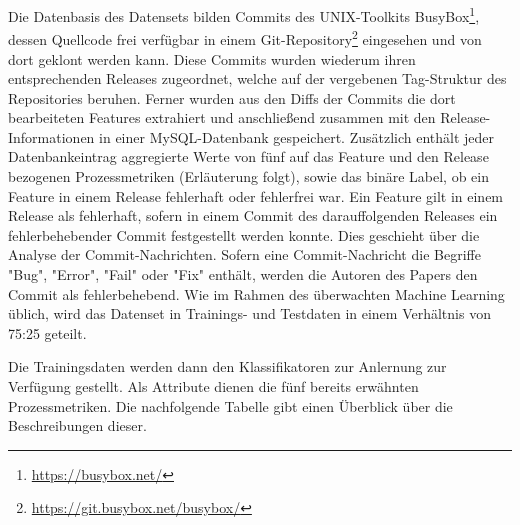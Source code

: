 Die Datenbasis des Datensets bilden Commits des UNIX-Toolkits BusyBox\footnote{\url{https://busybox.net/}}, dessen Quellcode frei verfügbar in einem Git-Repository\footnote{\url{https://git.busybox.net/busybox/}} eingesehen und von dort geklont werden kann. Diese Commits wurden wiederum ihren entsprechenden Releases zugeordnet, welche auf der vergebenen Tag-Struktur des Repositories beruhen. Ferner wurden aus den Diffs der Commits die dort bearbeiteten Features extrahiert und anschließend zusammen mit den Release-Informationen in einer MySQL-Datenbank gespeichert. Zusätzlich enthält jeder Datenbankeintrag aggregierte Werte von fünf auf das Feature und den Release bezogenen Prozessmetriken (Erläuterung folgt), sowie das binäre Label, ob ein Feature in einem Release fehlerhaft oder fehlerfrei war. Ein Feature gilt in einem Release als fehlerhaft, sofern in einem Commit des darauffolgenden Releases ein fehlerbehebender Commit festgestellt werden konnte. Dies geschieht über die Analyse der Commit-Nachrichten. Sofern eine Commit-Nachricht die Begriffe "Bug", "Error", "Fail" oder "Fix" enthält, werden die Autoren des Papers den Commit als fehlerbehebend. Wie im Rahmen des überwachten Machine Learning üblich, wird das Datenset in Trainings- und Testdaten in einem Verhältnis von 75:25 geteilt. 

Die Trainingsdaten werden dann den Klassifikatoren zur Anlernung zur Verfügung gestellt. Als Attribute dienen die fünf bereits erwähnten Prozessmetriken. Die nachfolgende Tabelle gibt einen Überblick über die Beschreibungen dieser.


